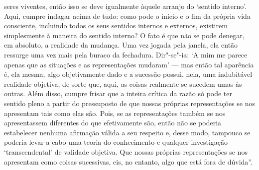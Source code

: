  seres viventes, então isso se deve igualmente àquele arranjo do `sentido
 interno'. Aqui, cumpre indagar acima de tudo: como pode o início e o fim da
 própria vida consciente, incluindo todos os seus sentidos internos e
 externos, existirem simplesmente à maneira do sentido interno? O fato é que
 não se pode denegar, em absoluto, a realidade da mudança. Uma vez jogada
 pela janela, ela então ressurge uma vez mais pela buraco da fechadura.
 Dir"-se"-ia: `A mim me parece apenas que as situações e as representações
 mudaram' --- mas então tal aparência é, ela mesma, algo objetivamente dado e
 a sucessão possui, nela, uma indubitável realidade objetiva, de sorte que,
 aqui, as coisas realmente se sucedem umas às outras. Além disso, cumpre
 frisar que a inteira crítica da razão só pode ter sentido pleno a partir do
 pressuposto de que nossas próprias representações se nos apresentam tais
 como elas são. Pois, se as representações também se nos apresentassem
 diferentes do que efetivamente são, então não se poderia estabelecer nenhuma
 afirmação válida a seu respeito e, desse modo, tampouco se poderia levar a
 cabo uma teoria do conhecimento e qualquer investigação `transcendental' de
 validade objetiva. Que nossas próprias representações se nos apresentam como
 coisas sucessivas, eis, no entanto, algo que está fora de dúvida''.


